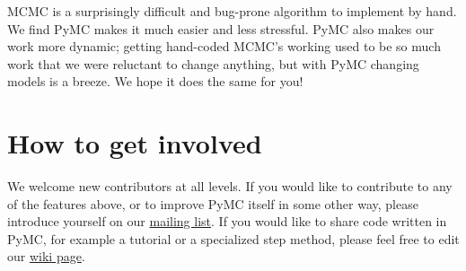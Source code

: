 
MCMC is a surprisingly difficult and bug-prone algorithm to implement by hand. We find PyMC makes it much easier and less stressful. PyMC also makes our work more dynamic; getting hand-coded MCMC's working used to be so much work that we were reluctant to change anything, but with PyMC changing models is a breeze. We hope it does the same for you!

% 

\hypertarget{getinvolved}{}
\section{How to get involved} %

We welcome new contributors at all levels. If you would like to contribute to any of the features above, or to improve PyMC itself in some other way, please introduce yourself on our \href{pymc@googlegroups.com}{mailing list}. If you would like to share code written in PyMC, for example a tutorial or a specialized step method, please feel free to edit our \href{http://code.google.com/p/pymc/w/list}{wiki page}.
